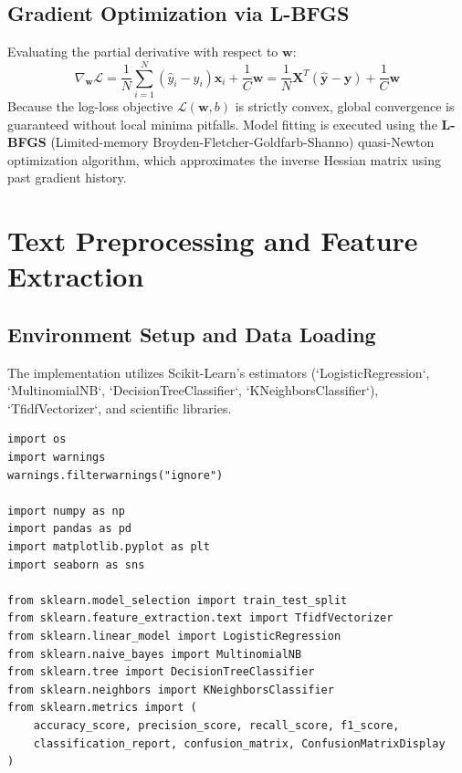 \documentclass[12pt]{article}
\begin{document}
\subsection{Gradient Optimization via L-BFGS}
Evaluating the partial derivative with respect to $\mathbf{w}$:
\begin{equation}
    \nabla_{\mathbf{w}} \mathcal{L} = \frac{1}{N} \sum_{i=1}^{N} (\hat{y}_i - y_i) \mathbf{x}_i + \frac{1}{C}\mathbf{w} = \frac{1}{N} \mathbf{X}^T (\hat{\mathbf{y}} - \mathbf{y}) + \frac{1}{C}\mathbf{w}
\end{equation}
Because the log-loss objective $\mathcal{L}(\mathbf{w}, b)$ is strictly convex, global convergence is guaranteed without local minima pitfalls. Model fitting is executed using the \textbf{L-BFGS} (Limited-memory Broyden-Fletcher-Goldfarb-Shanno) quasi-Newton optimization algorithm, which approximates the inverse Hessian matrix using past gradient history.

\newpage
\section{Text Preprocessing and Feature Extraction}

\subsection{Environment Setup and Data Loading}
The implementation utilizes Scikit-Learn's estimators (`LogisticRegression`, `MultinomialNB`, `DecisionTreeClassifier`, `KNeighborsClassifier`), `TfidfVectorizer`, and scientific libraries.

\begin{lstlisting}[style=code]
import os
import warnings
warnings.filterwarnings("ignore")

import numpy as np
import pandas as pd
import matplotlib.pyplot as plt
import seaborn as sns

from sklearn.model_selection import train_test_split
from sklearn.feature_extraction.text import TfidfVectorizer
from sklearn.linear_model import LogisticRegression
from sklearn.naive_bayes import MultinomialNB
from sklearn.tree import DecisionTreeClassifier
from sklearn.neighbors import KNeighborsClassifier
from sklearn.metrics import (
    accuracy_score, precision_score, recall_score, f1_score,
    classification_report, confusion_matrix, ConfusionMatrixDisplay
)
\end{lstlisting}
\end{document}
